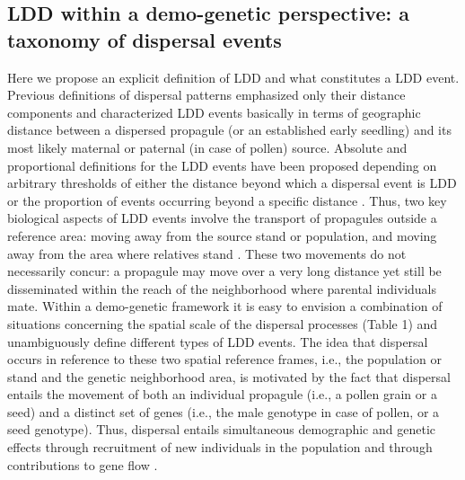 \documentclass[a4paper, 12pt]{article}
\begin{document}
\begin{linenumbers}
\subsection*{LDD within a demo-genetic perspective: a taxonomy of dispersal events}

Here we propose an explicit definition of LDD and what constitutes a LDD event. Previous definitions of dispersal patterns emphasized only their distance components and characterized LDD events basically in terms of geographic distance between a dispersed propagule (or an established early seedling) and its most likely maternal or paternal (in case of pollen) source. Absolute and proportional definitions for the LDD events have been proposed depending on arbitrary thresholds of either the distance beyond which a dispersal event is LDD or the proportion of events occurring beyond a specific distance \citep{Nathan:2005jc, Nathan:2008is}. Thus, two key biological aspects of LDD events involve the transport of propagules outside a reference area: moving away from the source stand or population, and moving away from the area where relatives stand \citep{Kinlan:2005fb}. These two movements do not necessarily concur: a propagule may move over a very long distance yet still be disseminated within the reach of the neighborhood where parental individuals mate. Within a demo-genetic framework it is easy to envision a combination of situations concerning the spatial scale of the dispersal processes (Table 1) and unambiguously define different types of LDD events. The idea that dispersal occurs in reference to these two spatial reference frames, i.e., the population or stand and the genetic neighborhood area, is motivated by the fact that dispersal entails the movement of both an individual propagule (i.e., a pollen grain or a seed) and a distinct set of genes (i.e., the male genotype in case of pollen, or a seed genotype). Thus, dispersal entails simultaneous demographic and genetic effects through recruitment of new individuals in the population and through contributions to gene flow \citep{Harper:1977aa}. 


\end{linenumbers}
\end{document}
